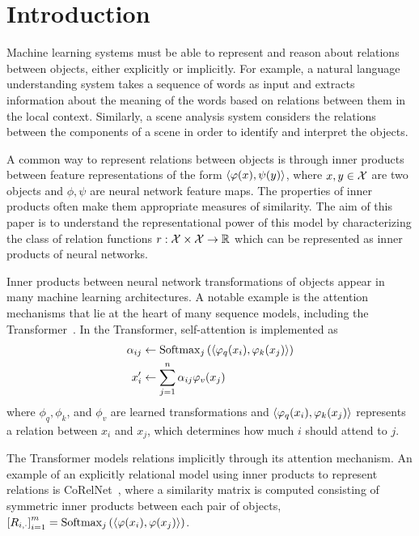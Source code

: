 \section{Introduction}\label{sec:intro}

Machine learning systems must be able to represent and reason about relations between objects, either explicitly or implicitly. For example, a natural language understanding system takes a sequence of words as input and extracts information about the meaning of the words based on relations between them in the local context. Similarly, a scene analysis system considers the relations between the components of a scene in order to identify and interpret the objects. 

A common way to represent relations between objects is through inner products between feature representations of the form $\left \langle \varphi(x), \psi(y) \right\rangle$, where $x, y \in {\mathcal{X}}$ are two objects and $\phi, \psi$ are neural network feature maps. The properties of inner products often make them appropriate measures of similarity. The aim of this paper is to understand the representational power of this model by characterizing the class of relation functions $r: {\mathcal{X}} \times {\mathcal{X}} \to \mathbb{R}$ which can be represented as inner products of neural networks.

Inner products between neural network transformations of objects appear in many machine learning architectures. A notable example is the attention mechanisms that lie at the heart of many sequence models, including the Transformer~\parencite{vaswani2017attention}. In the Transformer, self-attention is implemented as
\begin{equation*}
    \begin{split}
        \alpha_{ij} &\gets \mathrm{Softmax}_j\paren{{\iprod{\phi_q(x_i)}{\phi_k(x_j)}}}\\
        x_i' &\gets \sum_{j=1}^{n} \alpha_{ij} \phi_v(x_j)
    \end{split}
\end{equation*}
where $\phi_q, \phi_k$, and $\phi_v$ are learned transformations and $\left \langle \varphi_q(x_i), \varphi_k(x_j) \right\rangle$ represents a relation between $x_i$ and $x_j$, which determines how much $i$ should attend to $j$.

The Transformer models relations implicitly through its attention mechanism. An example of an explicitly relational model using inner products to represent relations is CoRelNet~\parencite{kergNeuralArchitecture2022}, where a similarity matrix is computed consisting of symmetric inner products between each pair of objects, $\left[R_{i,\cdot}\right]_{i=1}^m = \mathrm{Softmax}_j\left({\left \langle \varphi(x_i), \varphi(x_j) \right\rangle}\right)$.

